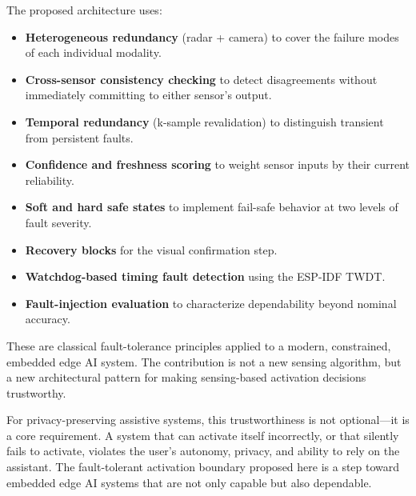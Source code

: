 \documentclass[12pt]{extarticle}
\begin{document}
The proposed architecture uses:
\begin{itemize}
  \item \textbf{Heterogeneous redundancy} (radar + camera) to cover the failure modes
        of each individual modality.
  \item \textbf{Cross-sensor consistency checking} to detect disagreements without
        immediately committing to either sensor's output.
  \item \textbf{Temporal redundancy} (k-sample revalidation) to distinguish transient
        from persistent faults.
  \item \textbf{Confidence and freshness scoring} to weight sensor inputs by their
        current reliability.
  \item \textbf{Soft and hard safe states} to implement fail-safe behavior at two
        levels of fault severity.
  \item \textbf{Recovery blocks} for the visual confirmation step.
  \item \textbf{Watchdog-based timing fault detection} using the ESP-IDF TWDT.
  \item \textbf{Fault-injection evaluation} to characterize dependability beyond
        nominal accuracy.
\end{itemize}

These are classical fault-tolerance principles applied to a modern, constrained,
embedded edge AI system.
The contribution is not a new sensing algorithm, but a new architectural pattern for
making sensing-based activation decisions trustworthy.

For privacy-preserving assistive systems, this trustworthiness is not optional---it
is a core requirement.
A system that can activate itself incorrectly, or that silently fails to activate,
violates the user's autonomy, privacy, and ability to rely on the assistant.
The fault-tolerant activation boundary proposed here is a step toward embedded edge AI
systems that are not only capable but also dependable.
\end{document}
